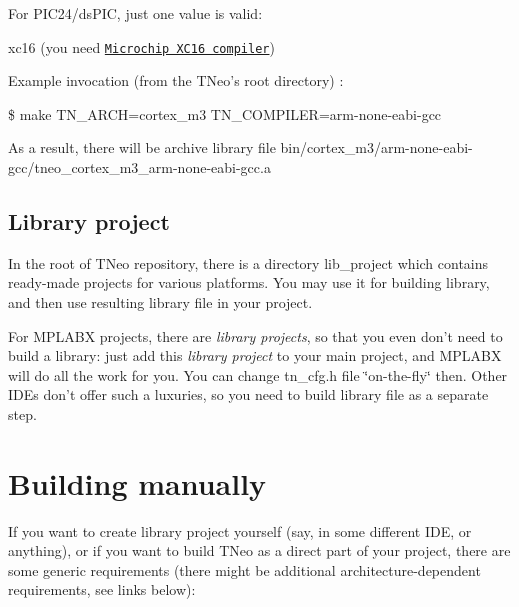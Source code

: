 For P\+I\+C24/ds\+P\+I\+C, just one value is valid\+:


\begin{DoxyItemize}
\item {\ttfamily xc16} (you need \href{http://www.microchip.com/xc16}{\tt Microchip X\+C16 compiler})
\end{DoxyItemize}

Example invocation (from the T\+Neo's root directory) \+:

{\ttfamily \$ make T\+N\+\_\+\+A\+R\+C\+H=cortex\+\_\+m3 T\+N\+\_\+\+C\+O\+M\+P\+I\+L\+E\+R=arm-\/none-\/eabi-\/gcc}

As a result, there will be archive library file {\ttfamily bin/cortex\+\_\+m3/arm-\/none-\/eabi-\/gcc/tneo\+\_\+cortex\+\_\+m3\+\_\+arm-\/none-\/eabi-\/gcc.\+a}\hypertarget{building_building_generic__lib_project}{}\subsection{Library project}\label{building_building_generic__lib_project}
In the root of T\+Neo repository, there is a directory {\ttfamily lib\+\_\+project} which contains ready-\/made projects for various platforms. You may use it for building library, and then use resulting library file in your project.

For M\+P\+L\+A\+B\+X projects, there are {\itshape library projects}, so that you even don't need to build a library\+: just add this {\itshape library project} to your main project, and M\+P\+L\+A\+B\+X will do all the work for you. You can change {\ttfamily tn\+\_\+cfg.\+h} file \char`\"{}on-\/the-\/fly\char`\"{} then. Other I\+D\+Es don't offer such a luxuries, so you need to build library file as a separate step.\hypertarget{building_building_generic__manual}{}\section{Building manually}\label{building_building_generic__manual}
If you want to create library project yourself (say, in some different I\+D\+E, or anything), or if you want to build T\+Neo as a direct part of your project, there are some generic requirements (there might be additional architecture-\/dependent requirements, see links below)\+:


